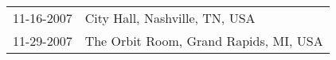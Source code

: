 \begin{supertabular}{ll}
 11-16-2007 &          City Hall, Nashville, TN, USA \\
 11-29-2007 &  The Orbit Room, Grand Rapids, MI, USA \\
\end{supertabular}
